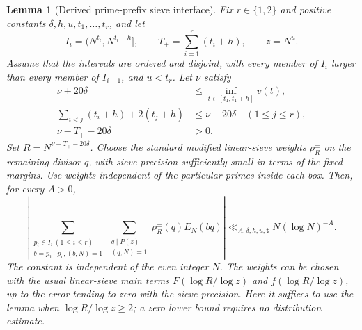 \documentclass[11pt]{article}
\newtheorem{lemma}[theorem]{Lemma}
\begin{document}
\begin{lemma}[Derived prime-prefix sieve interface]
\label{lem:prefix-interface}
Fix $r\in\{1,2\}$ and positive constants $\delta,h,u,t_1,\ldots,t_r$,
and let
\[
 I_i=(N^{t_i},N^{t_i+h}],\qquad
 T_+=\sum_{i=1}^r(t_i+h),\qquad z=N^u.
\]
Assume that the intervals are ordered and disjoint, with every member
of $I_i$ larger than every member of $I_{i+1}$, and $u<t_r$.
Let $\nu$ satisfy
\begin{align}
 \nu+20\delta&\le\inf_{t\in[t_1,t_1+h]}v(t),
       \label{eq:prefix-level-margin}\\
 \sum_{i<j}(t_i+h)+2(t_j+h)&\le\nu-20\delta
       \quad(1\le j\le r),
       \label{eq:prefix-vector-margin}\\
 \nu-T_+-20\delta&>0.
       \label{eq:prefix-residual-positive}
\end{align}
Set $R=N^{\nu-T_+-20\delta}$. Choose the standard modified
linear-sieve weights $\rho_R^{\pm}$ on the remaining divisor $q$,
with sieve precision sufficiently small in terms of the fixed margins.
Use weights independent of the particular primes inside each box.
Then, for every $A>0$,
\begin{equation}\label{eq:prefix-remainder}
 \left|\sum_{\substack{p_i\in I_i\ (1\le i\le r)\\
                         b=p_1\cdots p_r, (b,N)=1}}
       \sum_{\substack{q\mid P(z)\\(q,N)=1}}
       \rho_R^{\pm}(q)E_N(bq)\right|
 \ll_{A,\delta,h,u,\boldsymbol t}N(\log N)^{-A}.
\end{equation}
The constant is independent of the even integer $N$.
The weights can be chosen with the usual linear-sieve main terms
$F(\log R/\log z)$ and $f(\log R/\log z)$, up to the error tending
to zero with the sieve precision. Here it suffices to use the lemma
when $\log R/\log z\ge2$; a zero lower bound requires no distribution
estimate.
\end{lemma}
\end{document}
